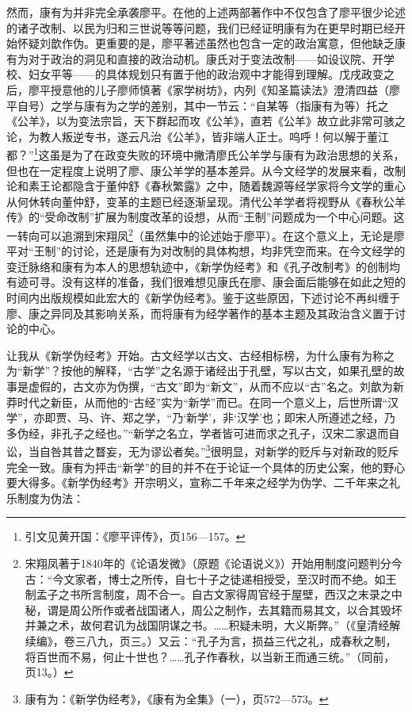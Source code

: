 \documentclass[a4paper, 12pt, openright]{ctexbook}
\begin{document}
然而，康有为并非完全承袭廖平。在他的上述两部著作中不仅包含了廖平很少论述的诸子改制、以民为归和三世说等等问题，我们已经证明康有为在更早时期已经开始怀疑刘歆作伪。更重要的是，廖平著述虽然也包含一定的政治寓意，但他缺乏康有为对于政治的洞见和直接的政治动机。康氏对于变法改制——如设议院、开学校、妇女平等——的具体规划只有置于他的政治观中才能得到理解。戊戌政变之后，廖平授意他的儿子廖师慎著《家学树坊》，内列《知圣篇读法》澄清四益（廖平自号）之学与康有为之学的差别，其中一节云：“自某等（指康有为等）托之《公羊》，以为变法宗旨，天下群起而攻《公羊》，直若《公羊》故立此非常可骇之论，为教人叛逆专书，遂云凡治《公羊》，皆非端人正士。呜呼！何以解于董江都？”\footnote{引文见黄开国：《廖平评传》，页156—157。}这虽是为了在政变失败的环境中撇清廖氏公羊学与康有为政治思想的关系，但也在一定程度上说明了廖、康公羊学的基本差异。从今文经学的发展来看，改制论和素王论都隐含于董仲舒《春秋繁露》之中，随着魏源等经学家将今文学的重心从何休转向董仲舒，变革的主题已经逐渐呈现。清代公羊学者将视野从《春秋公羊传》的“受命改制”扩展为制度改革的设想，从而“王制”问题成为一个中心问题。这一转向可以追溯到宋翔凤\footnote{宋翔凤著于1840年的《论语发微》（原题《论语说义》）开始用制度问题判分今古：“今文家者，博士之所传，自七十子之徒递相授受，至汉时而不绝。如王制孟子之书所言制度，周不合一。自古文家得周官经于屋壁，西汉之末录之中秘，谓是周公所作或者战国诸人，周公之制作，去其籍而易其文，以合其毁坏并兼之术，故何君讥为战国阴谋之书。……积疑未明，大义斯弊。”（《皇清经解续编》，卷三八九，页三。）又云：“孔子为言，损益三代之礼，成春秋之制，将百世而不易，何止十世也？……孔子作春秋，以当新王而通三统。”（同前，页13。）}（虽然集中的论述始于廖平）。在这个意义上，无论是廖平对“王制”的讨论，还是康有为对改制的具体构想，均非凭空而来。在今文经学的变迁脉络和康有为本人的思想轨迹中，《新学伪经考》和《孔子改制考》的创制均有迹可寻。没有这样的准备，我们很难想见康氏在廖、康会面后能够在如此之短的时间内出版规模如此宏大的《新学伪经考》。鉴于这些原因，下述讨论不再纠缠于廖、康之异同及其影响关系，而将康有为经学著作的基本主题及其政治含义置于讨论的中心。

让我从《新学伪经考》开始。古文经学以古文、古经相标榜，为什么康有为称之为“新学”？按他的解释，“古学”之名源于诸经出于孔壁，写以古文，如果孔壁的故事是虚假的，古文亦为伪撰，“古文”即为“新文”，从而不应以“古”名之。刘歆为新莽时代之新臣，从而他的“古经”实为“新学”而已。在同一个意义上，后世所谓“汉学”，亦即贾、马、许、郑之学，“乃‘新学’，非‘汉学’也；即宋人所遵述之经，乃多伪经，非孔子之经也。”“新学之名立，学者皆可进而求之孔子，汉宋二家退而自讼，当自咎其昔之瞀妄，无为谬讼者矣。”\footnote{康有为：《新学伪经考》，《康有为全集》（一），页572—573。}很明显，对新学的贬斥与对新政的贬斥完全一致。康有为抨击“新学”的目的并不在于论证一个具体的历史公案，他的野心要大得多。《新学伪经考》开宗明义，宣称二千年来之经学为伪学、二千年来之礼乐制度为伪法：
\end{document}
